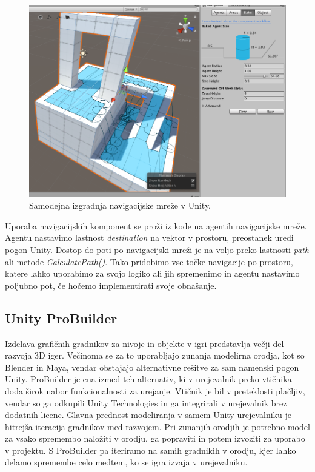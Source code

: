 \documentclass[12pt,a4paper,twoside]{book}
\begin{document}
\begin{figure}[h]
	\centering
	\includegraphics[width=15cm]{navmesh}
	\caption{Samodejna izgradnja navigacijske mreže v Unity.}
	\label{slika:navmesh}
\end{figure}

Uporaba navigacijskih komponent se proži iz kode na agentih navigacijske mreže. Agentu nastavimo lastnost \textit{destination} na vektor v prostoru, preostanek uredi pogon Unity. Dostop do poti po navigacijski mreži je na voljo preko lastnosti \textit{path} ali metode \textit{CalculatePath()}. Tako pridobimo vse točke navigacije po prostoru, katere lahko uporabimo za svojo logiko ali jih spremenimo in agentu nastavimo poljubno pot, če hočemo implementirati svoje obnašanje. 

\subsection{Unity ProBuilder}
Izdelava grafičnih gradnikov za nivoje in objekte v igri predstavlja večji del razvoja 3D iger. Večinoma se za to uporabljajo zunanja modelirna orodja, kot so Blender in Maya, vendar obstajajo alternativne rešitve za sam namenski pogon Unity. ProBuilder je ena izmed teh alternativ, ki v urejevalnik preko vtičnika doda širok nabor funkcionalnosti za urejanje. Vtičnik je bil v preteklosti plačljiv, vendar so ga odkupili Unity Technologies in ga integrirali v urejevalnik brez dodatnih licenc. Glavna prednost modeliranja v samem Unity urejevalniku je hitrejša iteracija gradnikov med razvojem. Pri zunanjih orodjih je potrebno model za vsako spremembo naložiti v orodju, ga popraviti in potem izvoziti za uporabo v projektu. S ProBuilder pa iteriramo na samih gradnikih v orodju, kjer lahko delamo spremembe celo medtem, ko se igra izvaja v urejevalniku.
\end{document}
